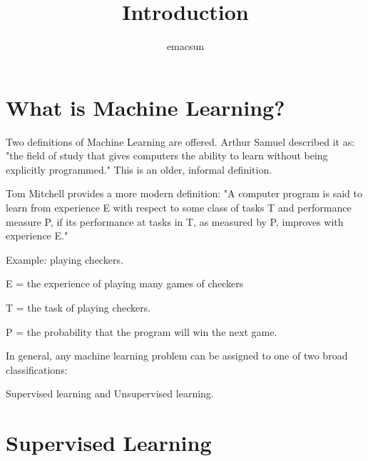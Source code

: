 \documentclass[10pt,a4paper,UTF8]{article}
\author{emacsun}
\date{}
\title{Introduction}
\begin{document}
\maketitle
\tableofcontents
{}
\section{What is Machine Learning?}
\label{sec:org22fd2ce}

Two definitions of Machine Learning are offered. Arthur Samuel described it as: "the field of study that gives computers the ability to learn without being explicitly programmed." This is an older, informal definition.

Tom Mitchell provides a more modern definition: "A computer program is said to learn from experience E with respect to some class of tasks T and performance measure P, if its performance at tasks in T, as measured by P, improves with experience E."

Example: playing checkers.

E = the experience of playing many games of checkers

T = the task of playing checkers.

P = the probability that the program will win the next game.

In general, any machine learning problem can be assigned to one of two broad classifications:

Supervised learning and Unsupervised learning.

\section{Supervised Learning}
\label{sec:org42866d7}
\end{document}
